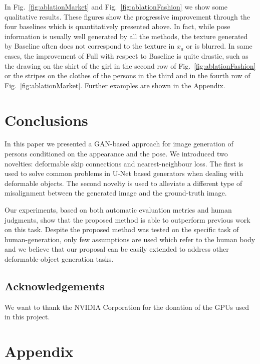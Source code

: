 \documentclass[10pt,twocolumn,letterpaper]{article}
\begin{document}
In Fig.~\ref{fig:ablationMarket} and Fig.~\ref{fig:ablationFashion} we show some qualitative results.
These figures show the progressive improvement through the four baselines which is quantitatively presented above.
In fact, while pose information is usually well generated by all the methods, 
the texture generated by Baseline often does not correspond to the texture in $x_a$ or is blurred. In same cases, the improvement of Full with respect to Baseline is quite drastic, such as the drawing on the shirt of the girl in the second row of Fig.~\ref{fig:ablationFashion} or 
the stripes on the clothes of the persons in the third and in the fourth row of Fig.~\ref{fig:ablationMarket}. Further examples are shown in the Appendix.






 

\section{Conclusions}
In this paper we presented a GAN-based approach for image generation of persons conditioned on the appearance and  the pose. We introduced two novelties: deformable skip connections and nearest-neighbour loss. The first is used to solve common problems in U-Net based generators when dealing with deformable objects. 
The second novelty is used to alleviate a different type of misalignment between the generated image and the ground-truth image.

Our experiments, based on both automatic evaluation metrics and human judgments,
show that the proposed method is able to outperform previous work on this task.
Despite the proposed method was tested on the specific task of human-generation, only few assumptions are used which refer to the human body and we believe that our proposal can be easily extended to address other deformable-object generation tasks.


\subsection*{Acknowledgements}
We want to thank the NVIDIA Corporation for the  donation  of  the  GPUs  used  in this project.






{\small


}
\clearpage

\appendix
\section*{Appendix}
\label{Appendix}
\end{document}
